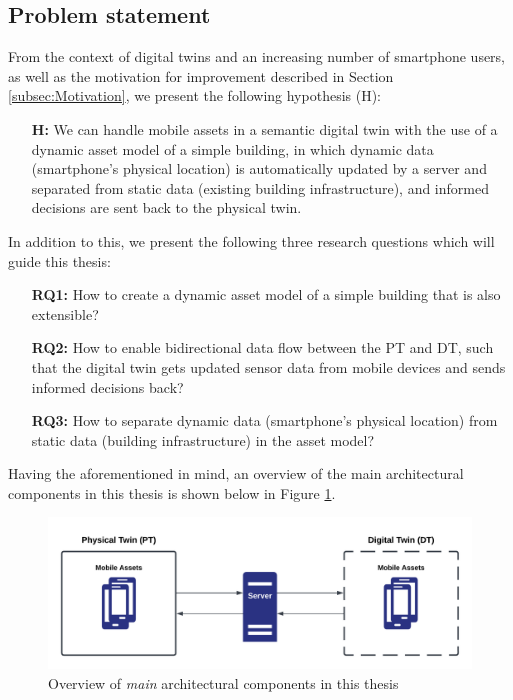 \documentclass{article}
\begin{document}
\subsection{Problem statement}\label{subsec:ProblemStatement}
From the context of digital twins and an increasing number of smartphone users, as well as the motivation for improvement described in Section \ref{subsec:Motivation}, we present the following hypothesis (H):

\begin{itemize}
    \item[\textbf{H:}] We can handle mobile assets in a semantic digital twin with the use of a dynamic asset model of a simple building, in which dynamic data (smartphone's physical location) is automatically updated by a server and separated from static data (existing building infrastructure), and informed decisions are sent back to the physical twin.
\end{itemize}


In addition to this, we present the following three research questions which will guide this thesis:
\begin{itemize}
    \item[\textbf{RQ1:}]
    How to create a dynamic asset model of a simple building that is also extensible?
    \item [\textbf{RQ2:}] 
    How to enable bidirectional data flow between the PT and DT, such that the digital twin gets updated sensor data from mobile devices and sends informed decisions back?
    \item [\textbf{RQ3:}]
    How to separate dynamic data (smartphone's physical location) from static data (building infrastructure) in the asset model?
\end{itemize}

Having the aforementioned in mind, an overview of the main architectural components in this thesis is shown below in Figure \ref{fig:initial_components}.

\begin{figure}[H]
    \centering
    \includegraphics[scale=0.14]{graphics/initial_thesis_overview.png}
    \caption{Overview of \emph{main} architectural components in this thesis}
    \label{fig:initial_components}
\end{figure}
\end{document}
